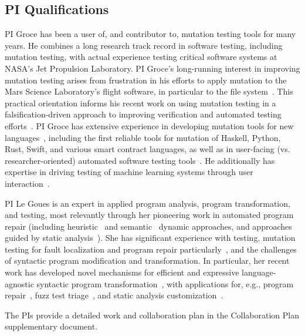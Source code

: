 

\subsection{PI Qualifications}

PI Groce has been a user of, and contributor to, mutation testing tools for many
years.  He combines a long research track record in software testing, including
mutation testing, with actual experience testing critical software systems at
NASA's Jet Propulsion Laboratory.  PI Groce's long-running interest in improving
mutation testing arises from frustration in his efforts to apply mutation to the
Mars Science Laboratory's flight software, in particular to the file
system~\cite{ICSEDiff,CFV08,AMAI}.  This practical orientation informs his
recent work on using mutation testing in a falsification-driven approach to
improving verification and automated testing
efforts~\cite{groce2015verified,groce2018verified,mutKernel}.  PI Groce has
extensive experience in developing mutation tools for new
languages~\cite{le2014mucheck,muupi,regexpMut}, including the first reliable
tools for mutation of Haskell, Python, Rust, Swift, and various smart
contract languages, as well as in user-facing
(vs. researcher-oriented) automated software testing
tools~\cite{tstlsttt,DeepState}.  He additionally has expertise in driving
testing of machine learning systems through user
interaction~\cite{EndUserMistake,OnlyOracle}.

PI Le Goues is an expert in applied program analysis, program transformation,
and testing, most relevantly through her pioneering work in automated program
repair (including heuristic~\cite{legouesNFWTSE2012} and
semantic~\cite{s3,Ke15ase} dynamic approaches, and approaches guided by
static analysis~\cite{footpatch}).  She has significant experience
with testing, mutation testing for fault localization and program repair
particularly~\cite{ssbse}, and the challenges of syntactic program
modification and transformation.  In particular, her recent work has developed
novel mechanisms for efficient and expressive language-agnostic syntactic
program transformation~\cite{rvt-ppc}, with applications for, e.g., program
repair~\cite{footpatch}, fuzz test triage~\cite{vantonder-ase18}, and static analysis
customization~\cite{vantonder-tailoring19}.

The PIs provide a detailed work and collaboration plan in the Collaboration Plan
supplementary document.
